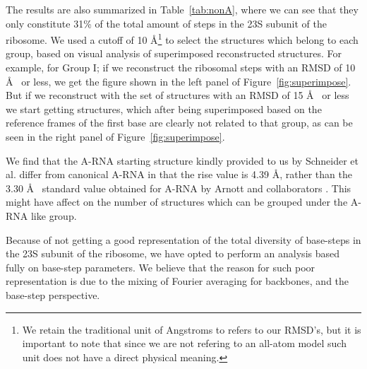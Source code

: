 The results are also  summarized in Table~\ref{tab:nonA}, where we can
see that they only constitute 31\% of the total amount of steps in the
23S subunit of the ribosome.  We  used a cutoff of 10 \AA \footnote{We
  retain the  traditional unit of  Angstroms to refers to  our RMSD's,
  but it  is important to  note that since  we are not refering  to an
  all-atom model such  unit does not have a  direct physical meaning.}
to select the  structures which belong to each  group, based on visual
analysis  of superimposed reconstructed  structures. For  example, for
Group I; if we reconstruct the ribosomal steps with an RMSD of 10 \AA~
or   less,  we   get  the   figure  shown   in  the   left   panel  of
Figure~\ref{fig:superimpose}. But  if we  reconstruct with the  set of
structures  with  an  RMSD  of  15  \AA~  or  less  we  start  getting
structures,  which after  being  superimposed based  on the  reference
frames of the first base are clearly not related to that group, as can
be seen in the right panel of Figure~\ref{fig:superimpose}.

We find  that the  A-RNA starting structure  kindly provided to  us by
Schneider et al. differ from canonical A-RNA in that the rise value is
4.39 \AA, rather than the  3.30 \AA~ standard value obtained for A-RNA
by Arnott and collaborators  \cite{arnott1973}. This might have affect
on the number of structures which  can be grouped under the A-RNA like
group.

Because of not getting a good representation of the total diversity of
base-steps  in the  23S  subunit of  the  ribosome, we  have opted  to
perform an  analysis based fully  on base-step parameters.  We believe
that the reason  for such poor representation is due  to the mixing of
Fourier averaging for backbones, and  the base-step perspective.


